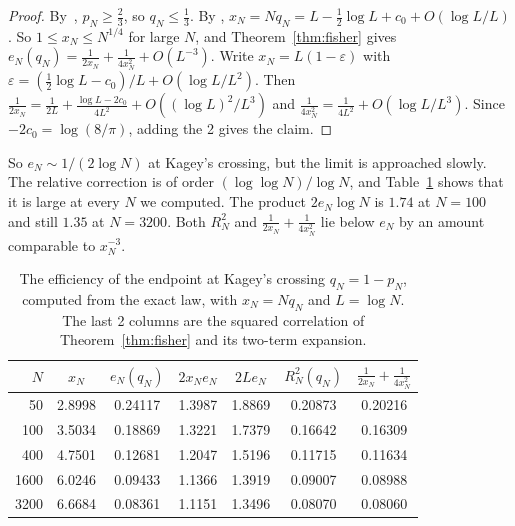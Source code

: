 \begin{proof}
By~\cite[Thm.~5.1]{paperA}, $p_N\ge\frac23$, so $q_N\le\frac13$. By
\cite[Thm.~5.2, Eq.~(7)]{paperA},
$x_N=Nq_N=L-\frac12\log L+c_0+O(\log L/L)$.
So $1\le x_N\le N^{1/4}$ for large $N$, and Theorem~\ref{thm:fisher} gives
$e_N(q_N)=\frac1{2x_N}+\frac1{4x_N^2}+O(L^{-3})$. Write
$x_N=L(1-\varepsilon)$ with $\varepsilon=(\frac12\log L-c_0)/L+O(\log L/L^2)$.
Then $\frac1{2x_N}=\frac1{2L}+\frac{\log L-2c_0}{4L^2}+O((\log L)^2/L^3)$ and
$\frac1{4x_N^2}=\frac1{4L^2}+O(\log L/L^3)$. Since $-2c_0=\log(8/\pi)$,
adding the 2 gives the claim.
\end{proof}

So $e_N\sim1/(2\log N)$ at Kagey's crossing, but the limit is approached
slowly. The relative correction is of order $(\log\log N)/\log N$, and
Table~\ref{tab:fisher} shows that it is large at every $N$ we computed.
The product $2e_N\log N$ is $1.74$ at $N=100$ and still $1.35$ at
$N=3200$. Both $R^2_N$ and
$\frac1{2x_N}+\frac1{4x_N^2}$ lie below $e_N$ by an amount comparable to
$x_N^{-3}$.

\begin{table}[ht]
\centering\small
\begin{tabular}{@{}rcccccc@{}}
\toprule
$N$ & $x_N$ & $e_N(q_N)$ & $2x_Ne_N$ & $2Le_N$ & $R^2_N(q_N)$
 & $\frac1{2x_N}+\frac1{4x_N^2}$\\
\midrule
50 & 2.8998 & 0.24117 & 1.3987 & 1.8869 & 0.20873 & 0.20216\\
100 & 3.5034 & 0.18869 & 1.3221 & 1.7379 & 0.16642 & 0.16309\\
400 & 4.7501 & 0.12681 & 1.2047 & 1.5196 & 0.11715 & 0.11634\\
1600 & 6.0246 & 0.09433 & 1.1366 & 1.3919 & 0.09007 & 0.08988\\
3200 & 6.6684 & 0.08361 & 1.1151 & 1.3496 & 0.08070 & 0.08060\\
\bottomrule
\end{tabular}
\caption{The efficiency of the endpoint at Kagey's crossing $q_N=1-p_N$,
computed from the exact law, with $x_N=Nq_N$ and $L=\log N$. The last 2
columns are the squared correlation of Theorem~\ref{thm:fisher} and its
two-term expansion.}
\label{tab:fisher}
\end{table}

